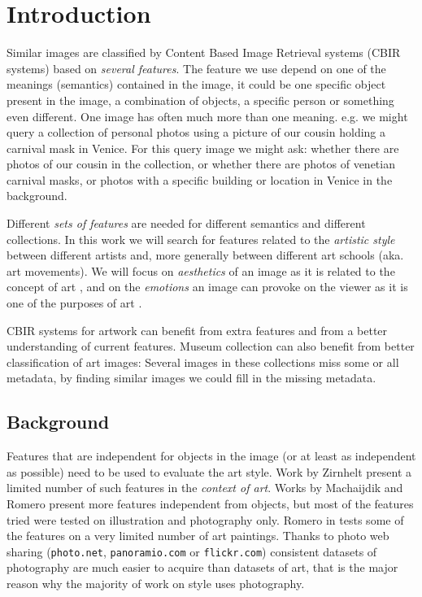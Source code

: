 \documentclass[11pt,a4paper,twoside,openright,draft]{report}
\begin{document}
\newpage
\null
\thispagestyle{empty}
\newpage

\newpage
\setcounter{page}{1}

\chapter{Introduction}
\begin{multicols}{2}

Similar images are classified by Content Based Image Retrieval systems (CBIR
systems) based on \emph{several features}.  The feature we use depend on one of
the meanings (semantics) contained in the image, it could be one specific
object present in the image, a combination of objects, a specific person or
something even different.  One image has often much more than one meaning.
e.g. we might query a collection of personal photos using a picture of our
cousin holding a carnival mask in Venice.  For this query image we might ask:
whether there are photos of our cousin in the collection, or whether there are
photos of venetian carnival masks, or photos with a specific building or
location in Venice in the background.

Different \emph{sets of features} are needed for different semantics and
different collections.  In this work we will search for features related to the
\emph{artistic style} between different artists and, more generally between
different art schools (aka. art movements).  We will focus on \emph{aesthetics}
of an image as it is related to the concept of art \cite{rmc12ajs}, and on the
\emph{emotions} an image can provoke on the viewer as it is one of the purposes
of art \cite{mach10clas}.

CBIR systems for artwork \cite{cfsp12air,isv12mpeg,ymvz03tree} can benefit from
extra features and from a better understanding of current features.  Museum
collection can also benefit from better classification of art images:  Several
images in these collections miss some or all metadata, by finding similar
images we could fill in the missing metadata.

\section{Background}

Features that are independent for objects in the image (or at least as
independent as possible) need to be used to evaluate the art style.  Work by
Zirnhelt \cite{zirnhelt07art} present a limited number of such features in the
\emph{context of art}.  Works by Machaijdik \cite{mach10clas} and Romero
\cite{rmc12ajs} present more features independent from objects, but most of the
features tried were tested on illustration and photography only.  Romero in
\cite{rmc12ajs} tests some of the features on a very limited number of art
paintings.  Thanks to photo web sharing (\texttt{photo.net},
\texttt{panoramio.com} or \texttt{flickr.com}) consistent datasets of
photography are much easier to acquire than datasets of art, that is the major
reason why the majority of work on style uses photography.


\end{multicols}
\end{document}
